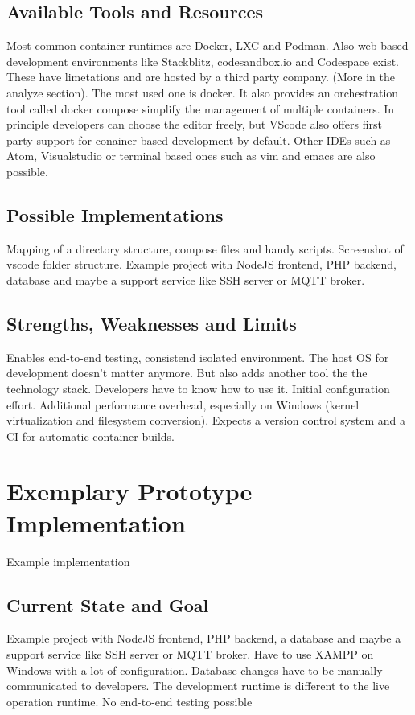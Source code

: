 \documentclass[12pt, a4paper]{article}
\begin{document}
    \subsection{Available Tools and Resources}
    Most common container runtimes are Docker, LXC and Podman. Also web based development environments like Stackblitz, codesandbox.io and Codespace exist. These have limetations and are hosted by a third party company. (More in the analyze section). The most used one is docker. It also provides an orchestration tool called docker compose simplify the management of multiple containers. In principle developers can choose the editor freely, but VScode also offers first party support for conainer-based development by default. Other IDEs such as Atom, Visualstudio or terminal based ones such as vim and emacs are also possible.
    \subsection{Possible Implementations}
    Mapping of a directory structure, compose files and handy scripts. Screenshot of vscode folder structure.
    Example project with NodeJS frontend, PHP backend, database and maybe a support service like SSH server or MQTT broker.
    \subsection{Strengths, Weaknesses and Limits}
    Enables end-to-end testing, consistend isolated environment. The host OS for development doesn't matter anymore. But also adds another tool the the technology stack. Developers have to know how to use it. Initial configuration effort.  Additional performance overhead, especially on Windows (kernel virtualization and filesystem conversion). Expects a version control system and a CI for automatic container builds.

\section{Exemplary Prototype Implementation}\label{sec::solution_code}
    Example implementation
    \subsection{Current State and Goal}
    Example project with NodeJS frontend, PHP backend, a database and maybe a support service like SSH server or MQTT broker. Have to use XAMPP on Windows with a lot of configuration. Database changes have to be manually communicated to developers. The development runtime is different to the live operation runtime. No end-to-end testing possible
\end{document}
